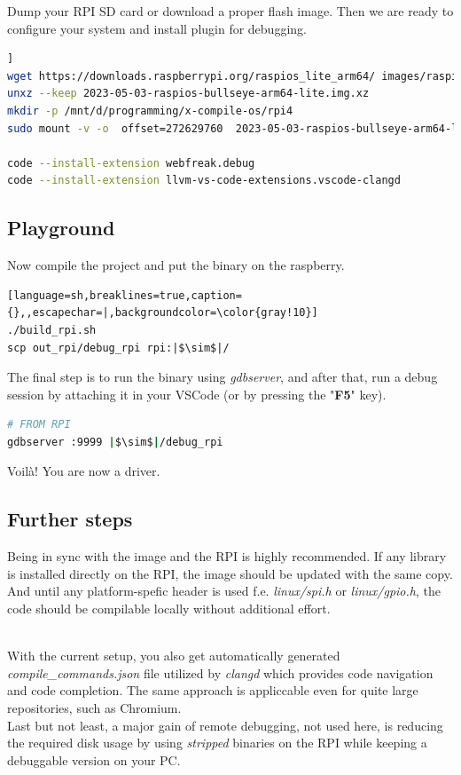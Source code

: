 \documentclass[twocolumn, 10pt]{article}
\begin{document}
Dump your RPI SD card or download a proper flash image\cite{bib:rpi-images}.
Then we are ready to configure your system and install plugin for debugging.

\begin{lstlisting}[language=sh,backgroundcolor=\color{gray!10},breaklines=true,escapechar=|,caption={}]]
wget https://downloads.raspberrypi.org/raspios_lite_arm64/ images/raspios_lite_arm64-2023-05-03/ 2023-05-03-raspios-bullseye-arm64-lite.img.xz
unxz --keep 2023-05-03-raspios-bullseye-arm64-lite.img.xz
mkdir -p /mnt/d/programming/x-compile-os/rpi4
sudo mount -v -o  offset=272629760  2023-05-03-raspios-bullseye-arm64-lite.img /mnt/d/programming/x-compile-os/rpi4

code --install-extension webfreak.debug
code --install-extension llvm-vs-code-extensions.vscode-clangd
\end{lstlisting}


\subsection*{Playground}
Now compile the project and put the binary on the raspberry.
\begin{lstlisting}[language=sh,breaklines=true,caption={},,escapechar=|,backgroundcolor=\color{gray!10}]
./build_rpi.sh
scp out_rpi/debug_rpi rpi:|$\sim$|/
\end{lstlisting}

The final step is to run the binary using \textit{gdbserver}, and after that, run a debug session by attaching it in your VSCode (or by pressing the "\textbf{F5}" key).
\begin{lstlisting}[language=sh,breaklines=true,caption={},escapechar=|,backgroundcolor=\color{gray!10}]
# FROM RPI
gdbserver :9999 |$\sim$|/debug_rpi
\end{lstlisting}
Voilà! You are now a driver.

\subsection*{Further steps}
Being in sync with the image and the RPI is highly recommended.
  If any library is installed directly on the RPI, the image
  should be updated with the same copy. And until any platform-spefic header is used
  f.e. \textit{linux/spi.h} or \textit{linux/gpio.h}, the code should be compilable
  locally without additional effort.

\\
With the current setup, you also get automatically generated \textit
  {compile\_commands.json} file utilized by \textit{clangd}
  \cite{bib:clangd} which provides code navigation and code completion.
  The same approach is appliccable even for quite large repositories,
  such as Chromium.
\\
Last but not least, a major gain of remote debugging, not used here, is reducing
  the required disk usage by using \textit{stripped} binaries on the RPI while keeping a debuggable version on your PC.
\end{document}
